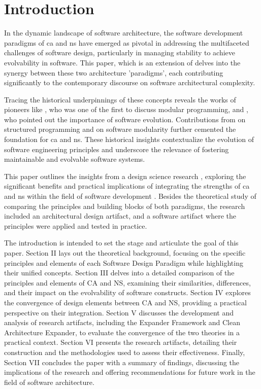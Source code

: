 \section{Introduction} \label{sec:introduction} 

In the dynamic landscape of software architecture, the software development paradigms of
\gls{ca} and \gls{ns} have emerged as pivotal in addressing the multifaceted challenges of
software design, particularly in managing stability to achieve evolvability in software.
This paper, which is an extension of 
\textcite{koks_converging_patterns_2024} delves into the synergy between these two
architecture 'paradigms', each contributing significantly to the contemporary discourse on
software architectural complexity.

Tracing the historical underpinnings of these concepts reveals the works of pioneers like
\textcite{d_mcilroy_nato_1968}, who was one of the first to discuss modular programming,
and \textcite{lehman_programs_1980}, who pointed out the importance of software evolution.
Contributions from \textcite{dijkstra_letters_1968} on structured programming and
\textcite{parnas_criteria_1972} on software modularity further cemented the foundation for
\gls{ca} and \gls{ns}. These historical insights contextualize the evolution of software
engineering principles and underscore the relevance of fostering maintainable and
evolvable software systems.

This paper outlines the insights from a design science research
, exploring the significant benefits and practical
implications of integrating the strengths of \gls{ca} and \gls{ns} within the field of
software development \cite{koks_convergence_2023}. Besides the theoretical study of
comparing the principles and building blocks of both paradigms, the research included an
architectural design artifact, and a software artifact where the principles were applied
and tested in practice.  

The introduction is intended to set the stage and articulate the goal of this paper.
Section II lays out the theoretical background, focusing on the specific principles and
elements of each Software Design Paradigm while highlighting their unified concepts.
Section III delves into a detailed comparison of the principles and elements of CA and NS,
examining their similarities, differences, and their impact on the evolvability of
software constructs. Section IV explores the convergence of design elements between CA and
NS, providing a practical perspective on their integration. Section V discusses the
development and analysis of research artifacts, including the Expander Framework and Clean
Architecture Expander, to evaluate the convergence of the two theories in a practical
context. Section VI presents the research artifacts, detailing their construction and the
methodologies used to assess their effectiveness. Finally, Section VII concludes the paper
with a summary of findings, discussing the implications of the research and offering
recommendations for future work in the field of software architecture.